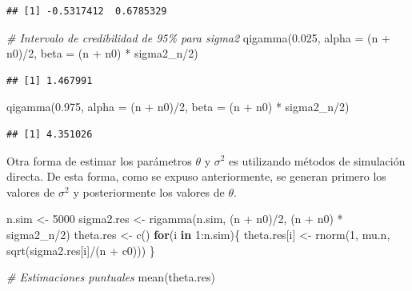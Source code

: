 \documentclass[
  10pt,
  spanish,
]{book}
\newenvironment{Shaded}{\begin{snugshade}}{\end{snugshade}}
\newcommand{\AttributeTok}[1]{\textcolor[rgb]{0.77,0.63,0.00}{#1}}
\newcommand{\CommentTok}[1]{\textcolor[rgb]{0.56,0.35,0.01}{\textit{#1}}}
\newcommand{\ControlFlowTok}[1]{\textcolor[rgb]{0.13,0.29,0.53}{\textbf{#1}}}
\newcommand{\DecValTok}[1]{\textcolor[rgb]{0.00,0.00,0.81}{#1}}
\newcommand{\FloatTok}[1]{\textcolor[rgb]{0.00,0.00,0.81}{#1}}
\newcommand{\FunctionTok}[1]{\textcolor[rgb]{0.00,0.00,0.00}{#1}}
\newcommand{\NormalTok}[1]{#1}
\newcommand{\OtherTok}[1]{\textcolor[rgb]{0.56,0.35,0.01}{#1}}
\newcommand{\SpecialCharTok}[1]{\textcolor[rgb]{0.00,0.00,0.00}{#1}}
\theoremstyle{definition}
\theoremstyle{definition}
\theoremstyle{definition}
\theoremstyle{definition}
\theoremstyle{remark}
\begin{document}
\begin{verbatim}
## [1] -0.5317412  0.6785329
\end{verbatim}

\begin{Shaded}
\begin{Highlighting}[]
\CommentTok{\# Intervalo de credibilidad de 95\% para sigma2}
\FunctionTok{qigamma}\NormalTok{(}\FloatTok{0.025}\NormalTok{, }\AttributeTok{alpha =}\NormalTok{ (n }\SpecialCharTok{+}\NormalTok{ n0)}\SpecialCharTok{/}\DecValTok{2}\NormalTok{, }
        \AttributeTok{beta =}\NormalTok{ (n }\SpecialCharTok{+}\NormalTok{ n0) }\SpecialCharTok{*}\NormalTok{ sigma2\_n}\SpecialCharTok{/}\DecValTok{2}\NormalTok{)}
\end{Highlighting}
\end{Shaded}

\begin{verbatim}
## [1] 1.467991
\end{verbatim}

\begin{Shaded}
\begin{Highlighting}[]
\FunctionTok{qigamma}\NormalTok{(}\FloatTok{0.975}\NormalTok{, }\AttributeTok{alpha =}\NormalTok{ (n }\SpecialCharTok{+}\NormalTok{ n0)}\SpecialCharTok{/}\DecValTok{2}\NormalTok{, }
        \AttributeTok{beta =}\NormalTok{ (n }\SpecialCharTok{+}\NormalTok{ n0) }\SpecialCharTok{*}\NormalTok{ sigma2\_n}\SpecialCharTok{/}\DecValTok{2}\NormalTok{)}
\end{Highlighting}
\end{Shaded}

\begin{verbatim}
## [1] 4.351026
\end{verbatim}

Otra forma de estimar los parámetros \(\theta\) y \(\sigma^2\) es utilizando métodos de simulación directa. De esta forma, como se expuso anteriormente, se generan primero los valores de \(\sigma^2\) y posteriormente los valores de \(\theta\).

\begin{Shaded}
\begin{Highlighting}[]
\NormalTok{n.sim }\OtherTok{\textless{}{-}} \DecValTok{5000}
\NormalTok{sigma2.res }\OtherTok{\textless{}{-}} \FunctionTok{rigamma}\NormalTok{(n.sim, (n }\SpecialCharTok{+}\NormalTok{ n0)}\SpecialCharTok{/}\DecValTok{2}\NormalTok{, }
\NormalTok{                        (n }\SpecialCharTok{+}\NormalTok{ n0) }\SpecialCharTok{*}\NormalTok{ sigma2\_n}\SpecialCharTok{/}\DecValTok{2}\NormalTok{)}
\NormalTok{theta.res }\OtherTok{\textless{}{-}} \FunctionTok{c}\NormalTok{()}
\ControlFlowTok{for}\NormalTok{(i }\ControlFlowTok{in} \DecValTok{1}\SpecialCharTok{:}\NormalTok{n.sim)\{}
\NormalTok{  theta.res[i] }\OtherTok{\textless{}{-}} \FunctionTok{rnorm}\NormalTok{(}\DecValTok{1}\NormalTok{, mu.n, }\FunctionTok{sqrt}\NormalTok{(sigma2.res[i]}\SpecialCharTok{/}\NormalTok{(n }\SpecialCharTok{+}\NormalTok{ c0)))}
\NormalTok{\}}

\CommentTok{\# Estimaciones puntuales}
\FunctionTok{mean}\NormalTok{(theta.res)}
\end{Highlighting}
\end{Shaded}
\end{document}

